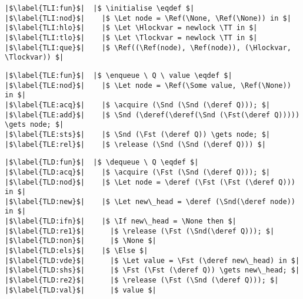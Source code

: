 \documentclass[a4paper, 11pt]{report}
\newcommand{\acquire}{\operatorname{acquire}}
\newcommand{\release}{\operatorname{release}}
\newcommand{\initialise}{\operatorname{initialize}}
\newcommand{\enqueue}{\operatorname{enqueue}}
\newcommand{\dequeue}{\operatorname{dequeue}}
\newcommand{\Hlockvar}{H\_lock}
\newcommand{\Tlockvar}{T\_lock}
\begin{document}
\begin{verbatim}
|$\label{TLI:fun}$|  |$ \initialise \eqdef $|
|$\label{TLI:nod}$|    |$ \Let node = \Ref(\None, \Ref(\None)) in $|
|$\label{TLI:hlo}$|    |$ \Let \Hlockvar = newlock \TT in $|
|$\label{TLI:tlo}$|    |$ \Let \Tlockvar = newlock \TT in $|
|$\label{TLI:que}$|    |$ \Ref((\Ref(node), \Ref(node)), (\Hlockvar, \Tlockvar)) $|
\end{verbatim}

\begin{verbatim}
|$\label{TLE:fun}$|  |$ \enqueue \ Q \ value \eqdef $|
|$\label{TLE:nod}$|    |$ \Let node = \Ref(\Some value, \Ref(\None)) in $|
|$\label{TLE:acq}$|    |$ \acquire (\Snd (\Snd (\deref Q))); $|
|$\label{TLE:add}$|    |$ \Snd (\deref(\deref(\Snd (\Fst(\deref Q))))) \gets node; $|
|$\label{TLE:sts}$|    |$ \Snd (\Fst (\deref Q)) \gets node; $|
|$\label{TLE:rel}$|    |$ \release (\Snd (\Snd (\deref Q))) $|
\end{verbatim}

\begin{verbatim}
|$\label{TLD:fun}$|  |$ \dequeue \ Q \eqdef $|
|$\label{TLD:acq}$|    |$ \acquire (\Fst (\Snd (\deref Q))); $|
|$\label{TLD:nod}$|    |$ \Let node = \deref (\Fst (\Fst (\deref Q))) in $|
|$\label{TLD:new}$|    |$ \Let new\_head = \deref (\Snd(\deref node)) in $|
|$\label{TLD:ifn}$|    |$ \If new\_head = \None then $|
|$\label{TLD:re1}$|      |$ \release (\Fst (\Snd(\deref Q))); $|
|$\label{TLD:non}$|      |$ \None $|
|$\label{TLD:els}$|    |$ \Else $|
|$\label{TLD:vde}$|      |$ \Let value = \Fst (\deref new\_head) in $|
|$\label{TLD:shs}$|      |$ \Fst (\Fst (\deref Q)) \gets new\_head; $|
|$\label{TLD:re2}$|      |$ \release (\Fst (\Snd (\deref Q))); $|
|$\label{TLD:val}$|      |$ value $|
\end{verbatim}

\end{document}
